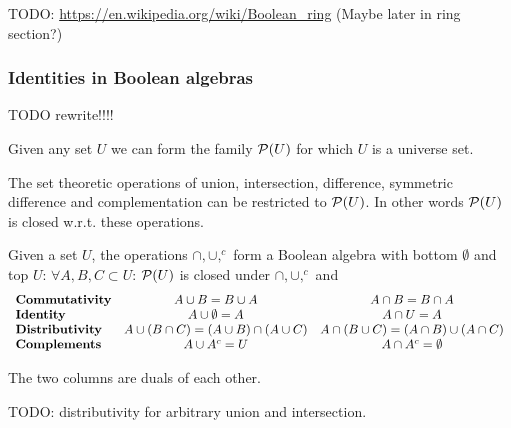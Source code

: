 TODO: \url{https://en.wikipedia.org/wiki/Boolean_ring} (Maybe later in ring section?)

\subsubsection{Identities in Boolean algebras}
TODO rewrite!!!!

Given any set $U$ we can form the family $\operatorname{\mathcal{P}}(U)$ for which $U$ is a universe set.

The set theoretic operations of union, intersection, difference, symmetric difference and complementation can be restricted to $\operatorname{\mathcal{P}}(U)$. In other words $\operatorname{\mathcal{P}}(U)$ is closed w.r.t. these operations.

\begin{proposition} \label{setBooleanAlgebra}
Given a set $U$, the operations $\cap, \cup, ^c$ form a Boolean algebra with bottom $\emptyset$ and top $U$: $\forall A,B,C\subset U$: $\operatorname{\mathcal{P}}(U)$ is closed under $\cap, \cup, ^c$ and
\[ \begin{array}{l c c}
\text{\textbf{Commutativity}} & A\cup B= B\cup A & A\cap B = B\cap A \\
\text{\textbf{Identity}} & A\cup\emptyset = A & A\cap U = A \\
\text{\textbf{Distributivity}} & A\cup(B\cap C) = (A\cup B)\cap(A\cup C) & A\cap(B\cup C) = (A\cap B)\cup(A\cap C) \\
\text{\textbf{Complements}} & A\cup A^c = U & A\cap A^c = \emptyset
\end{array} \]
\end{proposition}
The two columns are duals of each other.

TODO: distributivity for arbitrary union and intersection.

